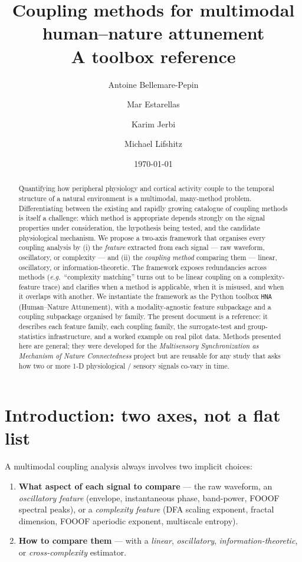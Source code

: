 \documentclass[11pt,a4paper]{article}
\title{\textbf{Coupling methods for multimodal human--nature attunement}\\[0.3em]
\large A toolbox reference}
\author{Antoine Bellemare-Pepin \and Mar Estarellas \and Karim Jerbi \and Michael Lifshitz}
\date{\today}
\begin{document}
\maketitle

\begin{abstract}
\noindent Quantifying how peripheral physiology and cortical activity couple
to the temporal structure of a natural environment is a multimodal,
many-method problem. Differentiating between the existing and rapidly
growing catalogue of coupling methods is itself a challenge: which
method is appropriate depends strongly on the signal properties under
consideration, the hypothesis being tested, and the candidate
physiological mechanism. We propose a two-axis framework that
organises every coupling analysis by (i) the \emph{feature} extracted
from each signal --- raw waveform, oscillatory, or complexity --- and
(ii) the \emph{coupling method} comparing them --- linear, oscillatory,
or information-theoretic. The framework exposes redundancies across
methods (\textit{e.g.}\ ``complexity matching'' turns out to be linear
coupling on a complexity-feature trace) and clarifies when a method is
applicable, when it is misused, and when it overlaps with another. We
instantiate the framework as the Python toolbox \texttt{HNA}
(Human--Nature Attunement), with a modality-agnostic feature subpackage
and a coupling subpackage organised by family. The present document is
a reference: it describes each feature family, each coupling family,
the surrogate-test and group-statistics infrastructure, and a worked
example on real pilot data. Methods presented here are general; they
were developed for the \emph{Multisensory Synchronization as Mechanism
of Nature Connectedness} project but are reusable for any study that
asks how two or more 1-D physiological / sensory signals co-vary in
time.
\end{abstract}

\tableofcontents

\section{Introduction: two axes, not a flat list}

A multimodal coupling analysis always involves two implicit choices:

\begin{enumerate}
  \item \textbf{What aspect of each signal to compare} --- the raw
        waveform, an \emph{oscillatory feature} (envelope, instantaneous
        phase, band-power, FOOOF spectral peaks), or a
        \emph{complexity feature} (DFA scaling exponent, fractal
        dimension, FOOOF aperiodic exponent, multiscale entropy).
  \item \textbf{How to compare them} --- with a \emph{linear},
        \emph{oscillatory}, \emph{information-theoretic}, or
        \emph{cross-complexity} estimator.
\end{enumerate}
\end{document}

